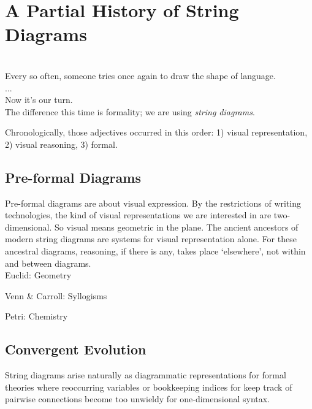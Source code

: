 \section{A Partial History of String Diagrams}

\\
Every so often, someone tries once again to draw the shape of language.\\
...\\
Now it's our turn.\\
The difference this time is formality; we are using \emph{string diagrams}.

 Chronologically, those adjectives occurred in this order: 1) visual representation, 2) visual reasoning, 3) formal.

\subsection{Pre-formal Diagrams}

Pre-formal diagrams are about visual expression. By the restrictions of writing technologies, the kind of visual representations we are interested in are two-dimensional. So visual means geometric in the plane. The ancient ancestors of modern string diagrams are systems for visual representation alone. For these ancestral diagrams, reasoning, if there is any, takes place `elsewhere', not within and between diagrams.\\

Euclid: Geometry

Venn \& Carroll: Syllogisms

Petri: Chemistry

\subsection{Convergent Evolution}

String diagrams arise naturally as diagrammatic representations for formal theories where reoccurring variables or bookkeeping indices for keep track of pairwise connections become too unwieldy for one-dimensional syntax.




